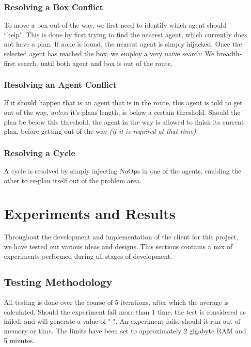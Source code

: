 \documentclass[letterpaper]{article}
\begin{document}
		\subsubsection{Resolving a Box Conflict}
			To move a box out of the way, we first need to identify which agent should ``help". This is done by first trying to find the nearest agent, which currently does not have a plan. If none is found, the nearest agent is simply hijacked. Once the selected agent has reached the box, we employ a very naïve search: We breadth-first search, until both agent and box is out of the route.

		\subsubsection{Resolving an Agent Conflict}
			If it should happen that is an agent that is in the route, this agent is told to get out of the way, \emph{unless} it's plans length, is below a certain threshold. Should the plan be below this threshold, the agent in the way is allowed to finish its current plan, before getting out of the way \emph{(if it is required at that time)}.

		\subsubsection{Resolving a Cycle}
			A cycle is resolved by simply injecting NoOps in one of the agents, enabling the other to re-plan itself out of the problem area.
		

\section{Experiments and Results}
	Throughout the development and implementation of the client for this project, we have tested out various ideas and designs. This sections contains a mix of experiments performed during all stages of development.

	\subsection{Testing Methodology}
		All testing is done over the course of 5 iterations, after which the average is calculated. Should the experiment fail more than 1 time, the test is considered as failed, and will generate a value of "-". An experiment fails, should it run out of memory or time. The limits have been set to approximately 2 gigabyte RAM and 5 minutes.
\end{document}
